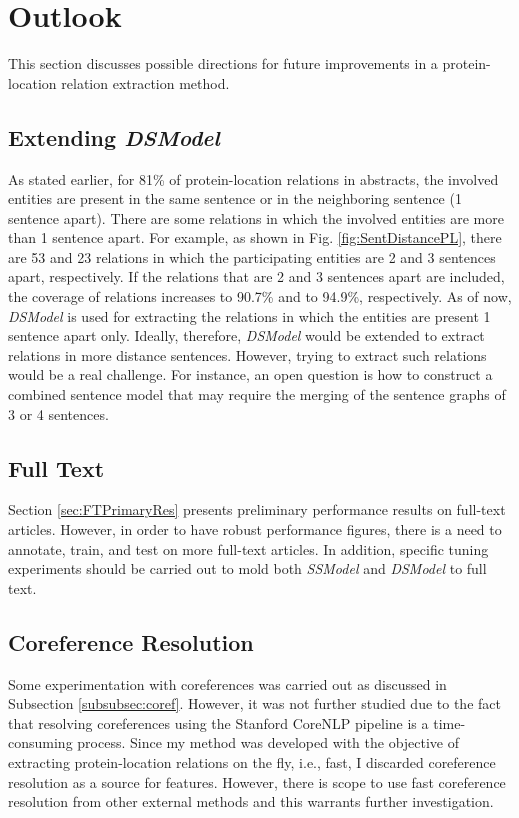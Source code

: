 \chapter{Outlook}\label{chapter:outlook}

This section discusses possible directions for future improvements in a protein-location relation extraction method.

\section{Extending \textit{DSModel}}

As stated earlier, for 81\% of protein-location relations in abstracts, the involved entities are present in the same sentence or in the neighboring sentence (1 sentence apart). There are some relations in which the involved entities are more than 1 sentence apart. For example, as shown in Fig. \ref{fig:SentDistancePL}, there are 53 and 23 relations in which the participating entities are 2 and 3 sentences apart, respectively. If the relations that are 2 and 3 sentences apart are included, the coverage of relations increases to 90.7\% and to 94.9\%, respectively. As of now, \textit{DSModel} is used for extracting the relations in which the entities are present 1 sentence apart only. Ideally, therefore, \textit{DSModel} would be extended to extract relations in more distance sentences. However, trying to extract such relations would be a real challenge. For instance, an open question is how to construct a combined sentence model that may require the merging of the sentence graphs of 3 or 4 sentences.

\section{Full Text}

Section \ref{sec:FTPrimaryRes} presents preliminary performance results on full-text articles. However, in order to have robust performance figures, there is a need to annotate, train, and test on more full-text articles. In addition, specific tuning experiments should be carried out to mold both \textit{SSModel} and \textit{DSModel} to full text.

\section{Coreference Resolution}

Some experimentation with coreferences was carried out as discussed in Subsection \ref{subsubsec:coref}. However, it was not further studied due to the fact that resolving coreferences using the Stanford CoreNLP pipeline \cite{manning2014stanford} is a time-consuming process. Since my method was developed with the objective of extracting protein-location relations on the fly, i.e., fast, I discarded coreference resolution as a source for features. However, there is scope to use fast coreference resolution from other external methods and this warrants further investigation.

